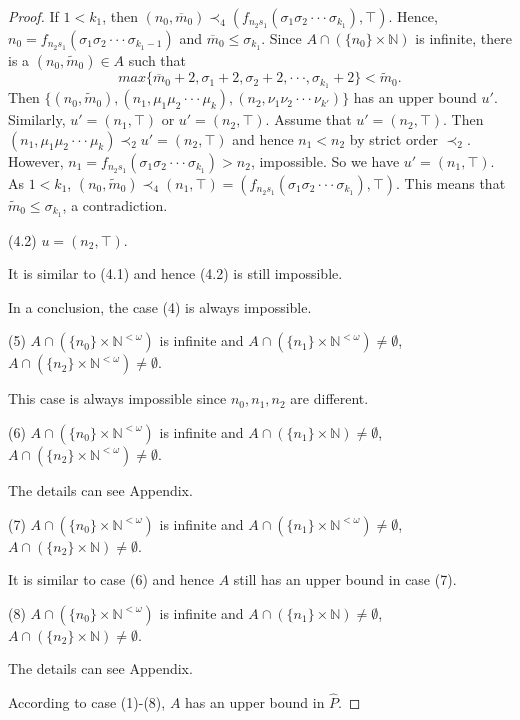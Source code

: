 \documentclass[preprint,12pt]{elsarticle}
\numberwithin{equation}{section}
\begin{document}
\begin{proof}
If $1<k_{1}$, then $(n_{0},\overline{m}_{0})\prec_{4}(f_{n_{2}s_{1}}(\sigma_{1}\sigma_{2}\cdot\cdot\cdot\sigma_{k_{1}}),\top)$. Hence, $n_{0}=f_{n_{2}s_{1}}(\sigma_{1}\sigma_{2}\cdot\cdot\cdot\sigma_{k_{1}-1})$ and $\overline{m}_{0}\leq\sigma_{k_{1}}$. Since $A\cap(\{n_{0}\}\times\mathbb{N})$ is infinite, there is a $(n_{0},\widetilde{m}_{0})\in A$ such that $$max\{\overline{m}_{0}+2,\sigma_{1}+2,\sigma_{2}+2,\cdot\cdot\cdot,\sigma_{k_{1}}+2\}<\widetilde{m}_{0}.$$
Then $\{(n_{0},\widetilde{m}_{0}),(n_{1},\mu_{1}\mu_{2}\cdot\cdot\cdot\mu_{k}),(n_{2},\nu_{1}\nu_{2}\cdot\cdot\cdot\nu_{k'})\}$ has an upper bound $u'$. Similarly, $u'=(n_{1},\top)$ or $u'=(n_{2},\top)$. Assume that $u'=(n_{2},\top)$. Then $(n_{1},\mu_{1}\mu_{2}\cdot\cdot\cdot\mu_{k})\prec_{2}u'=(n_{2},\top)$ and hence $n_{1}< n_{2}$ by strict order $\prec_{2}$. However, $n_{1}=f_{n_{2}s_{1}}(\sigma_{1}\sigma_{2}\cdot\cdot\cdot\sigma_{k_{1}})>n_{2}$, impossible. So we have $u'=(n_{1},\top)$. As $1<k_{1}$, $(n_{0},\widetilde{m}_{0})\prec_{4}(n_{1},\top)=(f_{n_{2}s_{1}}(\sigma_{1}\sigma_{2}\cdot\cdot\cdot\sigma_{k_{1}}),\top)$. This means that $\widetilde{m}_{0}\leq\sigma_{k_{1}}$, a contradiction.

(4.2) $u=(n_{2},\top)$.

It is similar to (4.1) and hence (4.2) is still impossible.

In a conclusion, the case (4) is always impossible.

(5) $A\cap(\{n_{0}\}\times\mathbb{N}^{<\omega})$ is infinite and $A\cap(\{n_{1}\}\times\mathbb{N}^{<\omega})\neq\emptyset$, $A\cap(\{n_{2}\}\times\mathbb{N}^{<\omega})\neq\emptyset$.

This case is always impossible since $n_{0},n_{1},n_{2}$ are different.

(6) $A\cap(\{n_{0}\}\times\mathbb{N}^{<\omega})$ is infinite and $A\cap(\{n_{1}\}\times\mathbb{N})\neq\emptyset$, $A\cap(\{n_{2}\}\times\mathbb{N}^{<\omega})\neq\emptyset$.

The details can see Appendix.


(7) $A\cap(\{n_{0}\}\times\mathbb{N}^{<\omega})$ is infinite and $A\cap(\{n_{1}\}\times\mathbb{N}^{<\omega})\neq\emptyset$, $A\cap(\{n_{2}\}\times\mathbb{N})\neq\emptyset$.

It is similar to case (6) and hence $A$ still has an upper bound in case (7).

(8) $A\cap(\{n_{0}\}\times\mathbb{N}^{<\omega})$ is infinite and $A\cap(\{n_{1}\}\times\mathbb{N})\neq\emptyset$, $A\cap(\{n_{2}\}\times\mathbb{N})\neq\emptyset$.

The details can see Appendix.

According to case (1)-(8), $A$ has an upper bound in $\widehat{P}$.\end{proof}
\end{document}
